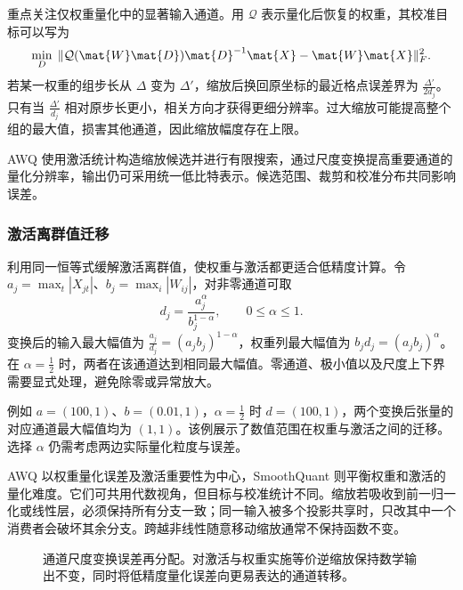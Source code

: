 \documentclass[../textbook.tex]{subfiles}
\begin{document}
重点关注仅权重量化中的显著输入通道\cite{lin2024awq}。用 $\mathcal Q$ 表示量化后恢复的权重，其校准目标可以写为
\begin{equation}
\min_D\;\|\mathcal Q(\mat{W}\mat{D})\mat{D}^{-1}\mat{X}-\mat{W}\mat{X}\|_F^2.
\end{equation}
若某一权重的组步长从 $\Delta$ 变为 $\Delta'$，缩放后换回原坐标的最近格点误差界为 $\frac{\Delta'}{2d_j}$。只有当 $\frac{\Delta'}{d_j}$ 相对原步长更小，相关方向才获得更细分辨率。过大缩放可能提高整个组的最大值，损害其他通道，因此缩放幅度存在上限。

AWQ 使用激活统计构造缩放候选并进行有限搜索，通过尺度变换提高重要通道的量化分辨率，输出仍可采用统一低比特表示。候选范围、裁剪和校准分布共同影响误差。

\subsubsection{激活离群值迁移}
利用同一恒等式缓解激活离群值，使权重与激活都更适合低精度计算\cite{xiao2023smoothquant}。令 $a_j=\max_t|X_{jt}|$、$b_j=\max_i|W_{ij}|$，对非零通道可取
\begin{equation}
d_j=\frac{a_j^\alpha}{b_j^{1-\alpha}},\qquad 0\le\alpha\le1.
\label{eq:opt-smooth}
\end{equation}
变换后的输入最大幅值为 $\frac{a_j}{d_j}=(a_jb_j)^{1-\alpha}$，权重列最大幅值为 $b_jd_j=(a_jb_j)^\alpha$。在 $\alpha=\frac{1}{2}$ 时，两者在该通道达到相同最大幅值。零通道、极小值以及尺度上下界需要显式处理，避免除零或异常放大。

例如 $a=(100,1)$、$b=(0.01,1)$，$\alpha=\frac{1}{2}$ 时 $d=(100,1)$，两个变换后张量的对应通道最大幅值均为 $(1,1)$。该例展示了数值范围在权重与激活之间的迁移。选择 $\alpha$ 仍需考虑两边实际量化粒度与误差。

AWQ 以权重量化误差及激活重要性为中心，SmoothQuant 则平衡权重和激活的量化难度。它们可共用代数视角，但目标与校准统计不同。缩放若吸收到前一归一化或线性层，必须保持所有分支一致；同一输入被多个投影共享时，只改其中一个消费者会破坏其余分支。跨越非线性随意移动缩放通常不保持函数不变。

\begin{figure}[htbp]
\centering
{}
\caption[通道尺度变换误差再分配]{通道尺度变换误差再分配。对激活与权重实施等价逆缩放保持数学输出不变，同时将低精度量化误差向更易表达的通道转移。}\label{fig:opt-scaling-graph}
\end{figure}
\end{document}

